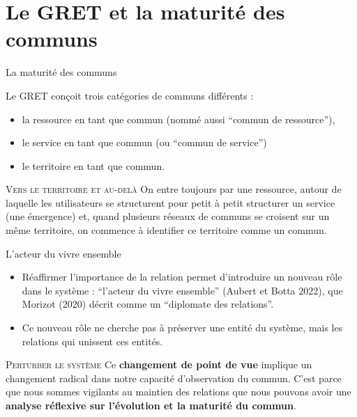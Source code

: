 \documentclass[newPxFont]{beamer}
\begin{document}

\section{Le GRET et la maturité des communs}

\begin{frame}[c]{La maturité des communs}
\vspace{-1cm}

Le GRET conçoit trois catégories de communs différents :
\begin{itemize}
    \item la ressource en tant que commun (nommé aussi “commun de ressource”),
    \item le service en tant que commun (ou “commun de service”)
    \item le territoire en tant que commun.
\end{itemize}

 \small{
   \begin{alertblock}{\textsc{Vers le territoire et au-delà}}
     On entre toujours par une ressource, autour de laquelle les utilisateurs se structurent pour petit à petit structurer un service (une émergence) et, quand plusieurs réseaux de communs se croisent sur un même territoire, on commence à identifier ce territoire comme un commun.
   \end{alertblock}
 }
\end{frame}

\begin{frame}[c]{L'acteur du vivre ensemble}
\vspace{-1cm}

\begin{itemize}
    \item Réaffirmer l’importance de la relation permet d’introduire un nouveau rôle dans le système : “l’acteur du vivre ensemble” (Aubert et Botta 2022), que Morizot (2020) décrit comme un “diplomate des relations”.
    \item Ce nouveau rôle ne cherche pas à préserver une entité du système, mais les relations qui unissent ces entités.
\end{itemize}

 \small{
   \begin{alertblock}{\textsc{Perturber le système}}
     Ce \textbf{changement de point de vue} implique un changement radical dans notre capacité d’observation du commun. C’est parce que nous sommes vigilants au maintien des relations que nous pouvons avoir une \textbf{analyse réflexive sur l’évolution et la maturité du commun}.
   \end{alertblock}
 }
\end{frame}
\end{document}
